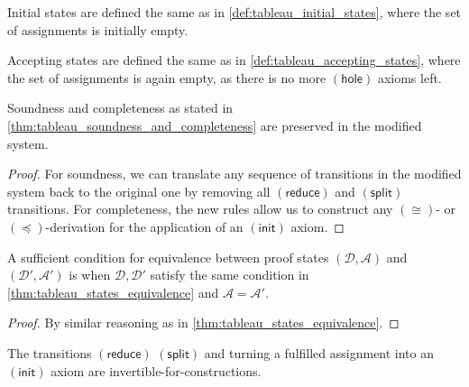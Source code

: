 \documentclass[twoside]{report}
\begin{document}
\begin{definition}
\label{def:tableau_initial_states_with_constraints}
Initial states are defined the same as in \cref{def:tableau_initial_states}, where the set of assignments is initially empty.
\end{definition}

\begin{definition}
\label{def:tableau_accepting_states_with_constraints}
Accepting states are defined the same as in \cref{def:tableau_accepting_states}, where the set of assignments is again empty, as there is no more $(\mathsf{hole})$ axioms left.
\end{definition}

\begin{proposition}
\label{thm:tableau_soundness_and_completeness_with_constraints}
Soundness and completeness as stated in \cref{thm:tableau_soundness_and_completeness} are preserved in the modified system.
\end{proposition}

\begin{proof}
For soundness, we can translate any sequence of transitions in the modified system back to the original one by removing all $(\mathsf{reduce})$ and $(\mathsf{split})$ transitions. For completeness, the new rules allow us to construct any $(\cong)$- or $(\preceq)$-derivation for the application of an $(\mathsf{init})$ axiom.
\end{proof}

\begin{proposition}
\label{thm:tableau_states_equivalence_with_constraints}
A sufficient condition for equivalence between proof states $(\mathcal D, \mathcal A)$ and $(\mathcal D', \mathcal A')$ is when $\mathcal D, \mathcal D'$ satisfy the same condition in \cref{thm:tableau_states_equivalence} and $\mathcal A = \mathcal A'$.
\end{proposition}

\begin{proof}
By similar reasoning as in \cref{thm:tableau_states_equivalence}.
\end{proof}

\begin{proposition}
\label{thm:tableau_transitions_invertibility_with_constraints}
The transitions $(\mathsf{reduce})$ $(\mathsf{split})$ and turning a fulfilled assignment into an $(\mathsf{init})$ axiom are invertible-for-constructions.
\end{proposition}
\end{document}
